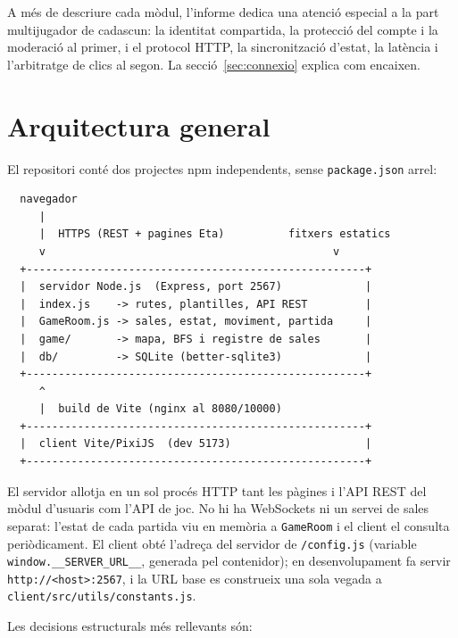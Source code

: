 \documentclass[11pt,a4paper]{article}
\begin{document}
A més de descriure cada mòdul, l'informe dedica una atenció especial a la part
multijugador de cadascun: la identitat compartida, la protecció del compte i la
moderació al primer, i el protocol HTTP, la sincronització d'estat, la latència i
l'arbitratge de clics al segon. La secció~\ref{sec:connexio} explica com encaixen.

\section{Arquitectura general}
\label{sec:arquitectura}

El repositori conté dos projectes npm independents, sense \texttt{package.json} arrel:

\begin{verbatim}
  navegador
     |
     |  HTTPS (REST + pagines Eta)          fitxers estatics
     v                                             v
  +-----------------------------------------------------+
  |  servidor Node.js  (Express, port 2567)             |
  |  index.js    -> rutes, plantilles, API REST         |
  |  GameRoom.js -> sales, estat, moviment, partida     |
  |  game/       -> mapa, BFS i registre de sales       |
  |  db/         -> SQLite (better-sqlite3)             |
  +-----------------------------------------------------+
     ^
     |  build de Vite (nginx al 8080/10000)
  +-----------------------------------------------------+
  |  client Vite/PixiJS  (dev 5173)                     |
  +-----------------------------------------------------+
\end{verbatim}

El servidor allotja en un sol procés HTTP tant les pàgines i l'API REST del mòdul
d'usuaris com l'API de joc. No hi ha WebSockets ni un servei de sales separat: l'estat
de cada partida viu en memòria a \texttt{GameRoom} i el client el consulta periòdicament.
El client obté l'adreça del servidor de \texttt{/config.js} (variable
\texttt{window.\_\_SERVER\_URL\_\_}, generada pel contenidor); en desenvolupament fa
servir \texttt{http://<host>:2567}, i la URL base es construeix una sola vegada a
\texttt{client/src/utils/constants.js}.

Les decisions estructurals més rellevants són:
\end{document}
